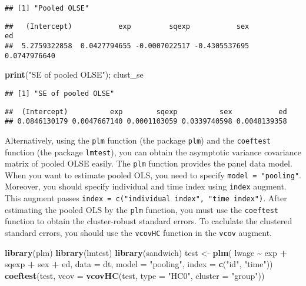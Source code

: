 \documentclass[
  12pt,
]{article}
\newenvironment{Shaded}{\begin{snugshade}}{\end{snugshade}}
\newcommand{\DataTypeTok}[1]{\textcolor[rgb]{0.13,0.29,0.53}{#1}}
\newcommand{\KeywordTok}[1]{\textcolor[rgb]{0.13,0.29,0.53}{\textbf{#1}}}
\newcommand{\NormalTok}[1]{#1}
\newcommand{\OperatorTok}[1]{\textcolor[rgb]{0.81,0.36,0.00}{\textbf{#1}}}
\newcommand{\StringTok}[1]{\textcolor[rgb]{0.31,0.60,0.02}{#1}}
\begin{document}
\begin{verbatim}
## [1] "Pooled OLSE"
\end{verbatim}

\begin{verbatim}
##   (Intercept)           exp         sqexp           sex            ed 
##  5.2759322858  0.0427794655 -0.0007022517 -0.4305537695  0.0747976640
\end{verbatim}

\begin{Shaded}
\begin{Highlighting}[]
\KeywordTok{print}\NormalTok{(}\StringTok{"SE of pooled OLSE"}\NormalTok{); clust\_se}
\end{Highlighting}
\end{Shaded}

\begin{verbatim}
## [1] "SE of pooled OLSE"
\end{verbatim}

\begin{verbatim}
##  (Intercept)          exp        sqexp          sex           ed 
## 0.0846130179 0.0047667140 0.0001103059 0.0339740598 0.0048139358
\end{verbatim}

Alternatively, using the \texttt{plm} function (the package
\texttt{plm}) and the \texttt{coeftest} function (the package
\texttt{lmtest}), you can obtain the asymptotic variance covariance
matrix of pooled OLSE easily. The \texttt{plm} function provides the
panel data model. When you want to estimate pooled OLS, you need to
specify \texttt{model\ =\ "pooling"}. Moreover, you should specify
individual and time index using \texttt{index} augment. This augment
passes \texttt{index\ =\ c("individual\ index",\ "time\ index")}. After
estimating the pooled OLS by the \texttt{plm} function, you must use the
\texttt{coeftest} function to obtain the cluster-robust standard errors.
To caclulate the clustered standard errors, you should use the
\texttt{vcovHC} function in the \texttt{vcov} augment.

\begin{Shaded}
\begin{Highlighting}[]
\KeywordTok{library}\NormalTok{(plm)}
\KeywordTok{library}\NormalTok{(lmtest)}
\KeywordTok{library}\NormalTok{(sandwich)}
\NormalTok{test \textless{}{-}}\StringTok{ }\KeywordTok{plm}\NormalTok{(}
\NormalTok{  lwage }\OperatorTok{\textasciitilde{}}\StringTok{ }\NormalTok{exp }\OperatorTok{+}\StringTok{ }\NormalTok{sqexp }\OperatorTok{+}\StringTok{ }\NormalTok{sex }\OperatorTok{+}\StringTok{ }\NormalTok{ed, }
  \DataTypeTok{data =}\NormalTok{ dt, }\DataTypeTok{model =} \StringTok{"pooling"}\NormalTok{, }\DataTypeTok{index =} \KeywordTok{c}\NormalTok{(}\StringTok{"id"}\NormalTok{, }\StringTok{"time"}\NormalTok{))}
\KeywordTok{coeftest}\NormalTok{(test, }\DataTypeTok{vcov =} \KeywordTok{vcovHC}\NormalTok{(test, }\DataTypeTok{type =} \StringTok{"HC0"}\NormalTok{, }\DataTypeTok{cluster =} \StringTok{"group"}\NormalTok{))}
\end{Highlighting}
\end{Shaded}
\end{document}
